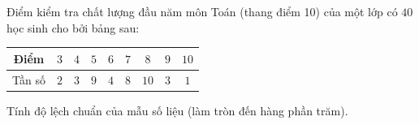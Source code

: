 \begin{ex}
Điểm kiểm tra chất lượng đầu năm môn Toán (thang điểm 10) của một lớp có $40$ học sinh cho bởi bảng sau:
\begin{center}
\begin{tabular}{|c|c|c|c|c|c|c|c|c|}\hline
Điểm & $3$ & $4$ & $5$ & $6$ & $7$ & $8$ & $9$ & $10$\\\hline
Tần số & $2$ & $3$ & $9$ & $4$ & $8$ & $10$ & $3$ & $1$\\\hline
\end{tabular}
\end{center}
Tính độ lệch chuẩn của mẫu số liệu (làm tròn đến hàng phần trăm).
\end{ex}
